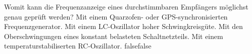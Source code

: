     {Womit kann die Frequenzanzeige eines durchstimmbaren Empfängers möglichst genau geprüft werden?}
    {Mit einem Quarzofen- oder GPS-synchronisierten Frequenzgenerator.}
    {Mit einem LC-Oszillator hoher Schwingkreisgüte.}
    {Mit den Oberschwingungen eines konstant belasteten Schaltnetzteils.}
    {Mit einem temperaturstabiliserten RC-Oszillator.}
    {false}{false}